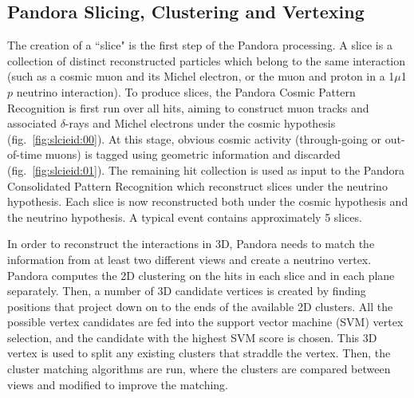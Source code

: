 \subsection{Pandora Slicing, Clustering and Vertexing}
The creation of a ``slice" is the first step of the Pandora processing. A slice is a collection of distinct reconstructed particles which belong to the same interaction (such as a cosmic muon and its Michel electron, or the muon and proton in a 1$\mu$1$p$ neutrino interaction). To produce slices, the Pandora Cosmic Pattern Recognition is first run over all hits, aiming to construct muon tracks and associated $\delta$-rays and Michel electrons under the cosmic hypothesis (fig.~\ref{fig:slcieid:00}). At this stage, obvious cosmic activity (through-going or out-of-time muons) is tagged using geometric information and discarded (fig.~\ref{fig:slcieid:01}). The remaining hit collection is used as input to the Pandora Consolidated Pattern Recognition which reconstruct slices under the neutrino hypothesis. Each slice is now reconstructed both under the cosmic hypothesis and the neutrino hypothesis. A typical event contains approximately 5 slices. 

\par In order to reconstruct the interactions in 3D, Pandora needs to match the information from at least two different views and create a neutrino vertex. Pandora computes the 2D clustering on the hits in each slice and in each plane separately. Then, a number of 3D candidate vertices is created by finding positions that project down on to the ends of the available 2D clusters. All the possible vertex candidates are fed into the support vector machine (SVM) vertex selection, and the candidate with the highest SVM score is chosen. This 3D vertex is used to split any existing clusters that straddle the vertex. Then, the cluster matching algorithms are run, where the clusters are compared between views and modified to improve the matching.

